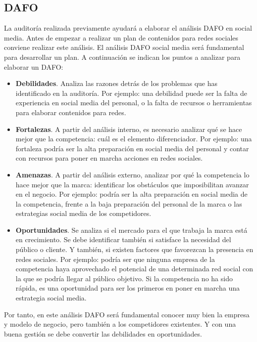 \subsection{DAFO}

La auditoría realizada previamente ayudará a elaborar el análisis DAFO en social media. Antes de empezar a realizar un plan de contenidos para redes sociales conviene realizar este análisis. El análisis DAFO social media será fundamental para desarrollar un plan. A continuación se indican los puntos a analizar para elaborar un DAFO:

\begin{itemize}
    \item \textbf{Debilidades}. Analiza las razones detrás de los problemas que has identificado en la auditoría. Por ejemplo: una debilidad puede ser la falta de experiencia en social media del personal, o la falta de recursos o herramientas para elaborar contenidos para redes. 
    \item \textbf{Fortalezas}. A partir del análisis interno, es necesario analizar qué se hace mejor que la competencia: cuál es el elemento diferenciador. Por ejemplo: una fortaleza podría ser la alta preparación en social media del personal y contar con recursos para poner en marcha acciones en redes sociales.
    \item \textbf{Amenazas}. A partir del análisis externo, analizar por qué la competencia lo hace mejor que la marca: identificar los obstáculos que imposibilitan avanzar en el negocio. Por ejemplo: podría ser la alta preparación en social media de la competencia, frente a la baja preparación del personal de la marca o las estrategias social media de los competidores.
    \item \textbf{Oportunidades}. Se analiza si el mercado para el que trabaja la marca está en crecimiento. Se debe identificar también si satisface la necesidad del público o cliente. Y también, si existen factores que favorezcan la presencia en redes sociales. Por ejemplo: podría ser que ninguna empresa de la competencia haya aprovechado el potencial de una determinada red social con la que se podría llegar al público objetivo. Si la competencia no ha sido rápida, es una oportunidad para ser los primeros en poner en marcha una estrategia social media.
\end{itemize}

Por tanto, en este análisis DAFO será fundamental conocer muy bien la empresa y modelo de negocio, pero también a los competidores existentes. Y con una buena gestión se debe convertir las debilidades en oportunidades.

